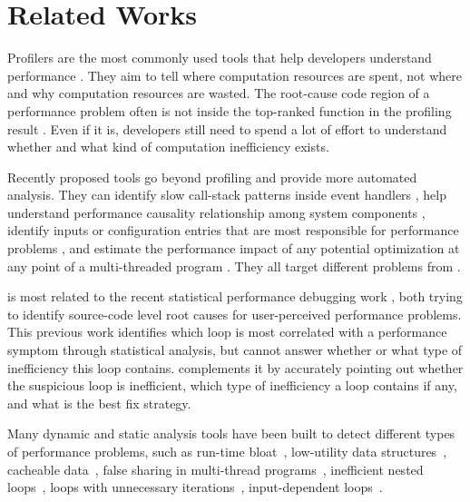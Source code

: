 \section{Related Works}
\label{sec:related}

Profilers are the most commonly used tools that help developers understand
performance
\cite{Zaparanuks:2012:AP:2254064.2254074,Coppa:2012:IP:2254064.2254076,
D'Elia:2011:MHC:1993498.1993559, 
Mytkowicz:2010:EAJ:1806596.1806618,
Ravindranath:2012:AMA:2387880.2387891,
Jovic:2011:CMY:2048066.2048081,IntroPerf}.
They aim to tell where 
computation resources are spent, 
not where and why computation resources are wasted. 
The root-cause code region of a performance problem often is not inside
the top-ranked function in the profiling result \cite{SongOOPSLA2014}.
Even if it is, developers still need to spend a lot of effort to understand
whether and what kind of computation inefficiency exists.

Recently proposed tools go beyond profiling and provide more automated analysis.
They can identify slow call-stack patterns inside event handlers
\cite{Han:2012:PDL:2337223.2337241}, help understand performance causality
relationship among system components
\citet{TaoAsplos2014}, identify inputs 
or configuration entries that are most responsible for performance problems
\cite{Attariyan:2012:XAR:2387880.2387910},
and estimate the performance impact of any
potential optimization at any point of a multi-threaded program
\cite{coz.sosp15}. 
They all target different problems from \Tool. 

\Tool is most related to
the recent statistical performance debugging work
\citep{SongOOPSLA2014}, both trying to identify source-code level root causes
for user-perceived performance problems. 
This previous work identifies which loop is most correlated with 
a performance symptom through statistical analysis, 
but cannot answer whether or 
what type of inefficiency this loop contains.
\Tool complements it by
accurately pointing out whether the suspicious loop is inefficient,
which type of inefficiency a loop contains if any, and 
what is the best fix strategy.

Many dynamic and static analysis tools have been built to detect different
types of performance problems, such as 
run-time bloat~\cite{Dufour:2008:STC:1453101.1453111, Xu:2009:GFP:1542476.1542523, Xu:2010:DIC:1806596.1806616}, 
low-utility data structures~\cite{Xu:2010:FLD:1806596.1806617}, 
cacheable data~\cite{Cachetor}, false sharing in
multi-thread programs~\cite{Liu:2011:SPD:2048066.2048070},
inefficient nested loops~\cite{Alabama},
loops with unnecessary iterations~\cite{CARAMEL,IsilDillig.PLDI15},
input-dependent loops~\cite{xiao13:context}. 


